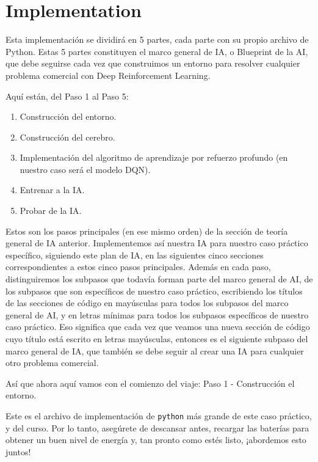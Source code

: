 \documentclass[]{book}
\providecommand{\tightlist}{%
  \setlength{\itemsep}{0pt}\setlength{\parskip}{0pt}}
\begin{document}
\hypertarget{implementation}{%
\section{Implementation}\label{implementation}}

Esta implementación se dividirá en 5 partes, cada parte con su propio archivo de Python. Estas 5 partes constituyen el marco general de IA, o Blueprint de la AI, que debe seguirse cada vez que construimos un entorno para resolver cualquier problema comercial con Deep Reinforcement Learning.

Aquí están, del Paso 1 al Paso 5:

\begin{enumerate}
\def\labelenumi{\arabic{enumi}.}
\tightlist
\item
  Construcción del entorno.
\item
  Construcción del cerebro.
\item
  Implementación del algoritmo de aprendizaje por refuerzo profundo (en nuestro caso será el modelo DQN).
\item
  Entrenar a la IA.
\item
  Probar de la IA.
\end{enumerate}

Estos son los pasos principales (en ese mismo orden) de la sección de teoría general de IA anterior. Implementemos así nuestra IA para nuestro caso práctico específico, siguiendo este plan de IA, en las siguientes cinco secciones correspondientes a estos cinco pasos principales. Además en cada paso, distinguiremos los subpasos que todavía forman parte del marco general de AI, de los subpasos que son específicos de nuestro caso práctico, escribiendo los títulos de las secciones de código en mayúsculas para todos los subpasos del marco general de AI, y en letras mínimas para todos los subpasos específicos de nuestro caso práctico. Eso significa que cada vez que veamos una nueva sección de código cuyo título está escrito en letras mayúsculas, entonces es el siguiente subpaso del marco general de IA, que también se debe seguir al crear una IA para cualquier otro problema comercial.

Así que ahora aquí vamos con el comienzo del viaje: Paso 1 - Construcción el entorno.

Este es el archivo de implementación de \texttt{python} más grande de este caso práctico, y del curso. Por lo tanto, asegúrete de descansar antes, recargar las baterías para obtener un buen nivel de energía y, tan pronto como estés listo, ¡abordemos esto juntos!
\end{document}
